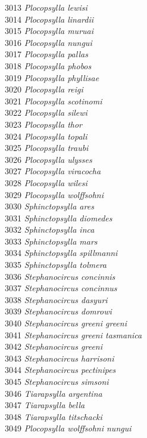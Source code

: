 \documentclass[
]{article}
\begin{document}
3013 \emph{Plocopsylla lewisi}\\
3014 \emph{Plocopsylla linardii}\\
3015 \emph{Plocopsylla muruai}\\
3016 \emph{Plocopsylla nungui}\\
3017 \emph{Plocopsylla pallas}\\
3018 \emph{Plocopsylla phobos}\\
3019 \emph{Plocopsylla phyllisae}\\
3020 \emph{Plocopsylla reigi}\\
3021 \emph{Plocopsylla scotinomi}\\
3022 \emph{Plocopsylla silewi}\\
3023 \emph{Plocopsylla thor}\\
3024 \emph{Plocopsylla topali}\\
3025 \emph{Plocopsylla traubi}\\
3026 \emph{Plocopsylla ulysses}\\
3027 \emph{Plocopsylla viracocha}\\
3028 \emph{Plocopsylla wilesi}\\
3029 \emph{Plocopsylla wolffsohni}\\
3030 \emph{Sphinctopsylla ares}\\
3031 \emph{Sphinctopsylla diomedes}\\
3032 \emph{Sphinctopsylla inca}\\
3033 \emph{Sphinctopsylla mars}\\
3034 \emph{Sphinctopsylla spillmanni}\\
3035 \emph{Sphinctopsylla tolmera}\\
3036 \emph{Stephanocircus concinnis}\\
3037 \emph{Stephanocircus concinnus}\\
3038 \emph{Stephanocircus dasyuri}\\
3039 \emph{Stephanocircus domrowi}\\
3040 \emph{Stephanocircus greeni greeni}\\
3041 \emph{Stephanocircus greeni tasmanica}\\
3042 \emph{Stephanocircus greeni}\\
3043 \emph{Stephanocircus harrisoni}\\
3044 \emph{Stephanocircus pectinipes}\\
3045 \emph{Stephanocircus simsoni}\\
3046 \emph{Tiarapsylla argentina}\\
3047 \emph{Tiarapsylla bella}\\
3048 \emph{Tiarapsylla titschacki}\\
3049 \emph{Plocopsylla wolffsohni nungui}
\end{document}
